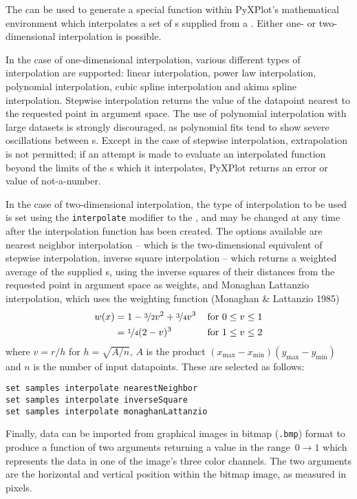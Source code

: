 The  can be used to generate a special function within
PyXPlot's mathematical environment which interpolates a set of \datapoint s
supplied from a \datafile. Either one- or two-dimensional interpolation is
possible.

In the case of one-dimensional interpolation, various different types of
interpolation are supported: linear interpolation, power law interpolation,
polynomial interpolation, cubic spline interpolation and akima spline
interpolation. Stepwise interpolation returns the value of the datapoint
nearest to the requested point in argument space. The use of polynomial
interpolation with large datasets is strongly discouraged, as polynomial fits
tend to show severe oscillations between \datapoint s.  Except in the case of
stepwise interpolation, extrapolation is not permitted; if an attempt is made
to evaluate an interpolated function beyond the limits of the \datapoint s
which it interpolates, PyXPlot returns an error or value of not-a-number.

In the case of two-dimensional interpolation, the type of interpolation to be
used is set using the {\tt interpolate} modifier to the ,
and may be changed at any time after the interpolation function has been
created.  The options available are nearest neighbor interpolation -- which is
the two-dimensional equivalent of stepwise interpolation, inverse square
interpolation -- which returns a weighted average of the supplied \datapoint s,
using the inverse squares of their distances from the requested point in
argument space as weights, and Monaghan Lattanzio interpolation, which uses the
weighting function (Monaghan \& Lattanzio 1985)
\begin{eqnarray*}
w(x) & = 1 - \nicefrac{3}{2}v^2 + \nicefrac{3}{4}v^3 & \,\mathrm{for~}0\leq v\leq 1 \\
     & = \nicefrac{1}{4}(2-v)^3                      & \,\mathrm{for~}1\leq v\leq 2
\end{eqnarray*}
where $v=r/h$ for $h=\sqrt{A/n}$, $A$ is the product
$(x_\mathrm{max}-x_\mathrm{min})(y_\mathrm{max}-y_\mathrm{min})$ and $n$ is the
number of input datapoints. These are selected as follows:

\begin{verbatim}
set samples interpolate nearestNeighbor
set samples interpolate inverseSquare
set samples interpolate monaghanLattanzio
\end{verbatim}

Finally, data can be imported from graphical images in bitmap ({\tt .bmp})
format to produce a function of two arguments returning a value in the
range~$0\to1$ which represents the data in one of the image's three color
channels. The two arguments are the horizontal and vertical position within the
bitmap image, as measured in pixels.

